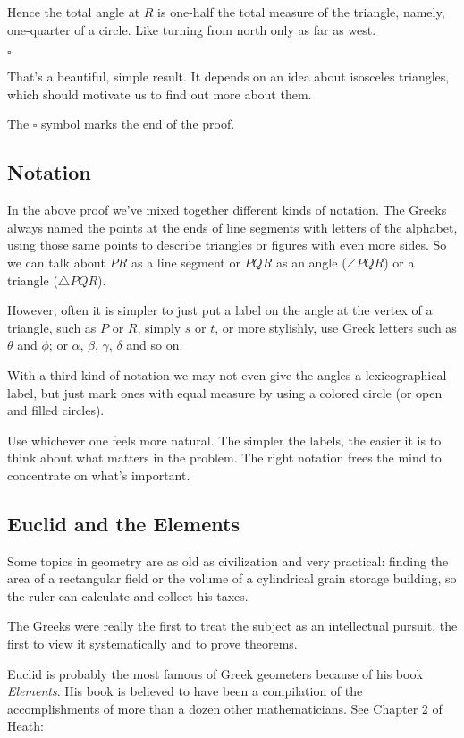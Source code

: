 \documentclass[11pt, oneside]{article}
\begin{document}
Hence the total angle at $R$ is one-half the total measure of the triangle, namely, one-quarter of a circle.  Like turning from north only as far as west.

$\square$

That's a beautiful, simple result.  It depends on an idea about isosceles triangles, which should motivate us to find out more about them.

The $\square$ symbol marks the end of the proof.

\subsection*{Notation}
In the above proof we've mixed together different kinds of notation.  The Greeks always named the points at the ends of line segments with letters of the alphabet, using those same points to describe triangles or figures with even more sides.  So we can talk about $PR$ as a line segment or $PQR$ as an angle ($\angle PQR$) or a triangle ($\triangle PQR$).

However, often it is simpler to just put a label on the angle at the vertex of a triangle, such as $P$ or $R$, simply $s$ or $t$, or more stylishly, use Greek letters such as $\theta$ and $\phi$; or $\alpha$, $\beta$, $\gamma$, $\delta$ and so on. 

With a third kind of notation we may not even give the angles a lexicographical label, but just mark ones with equal measure by using a colored circle (or open and filled circles).

Use whichever one feels more natural. The simpler the labels, the easier it is to think about what matters in the problem.  The right notation frees the mind to concentrate on what's important.

\subsection*{Euclid and the Elements}

Some topics in geometry are as old as civilization and very practical:  finding the area of a rectangular field or the volume of a cylindrical grain storage building, so the ruler can calculate and collect his taxes.

The Greeks were really the first to treat the subject as an intellectual pursuit, the first to view it systematically and to prove theorems.

Euclid is probably the most famous of Greek geometers because of his book \emph{Elements}.  His book is believed to have been a compilation of the accomplishments of more than a dozen other mathematicians.  See Chapter 2 of Heath:
\end{document}
